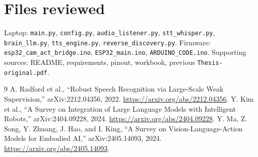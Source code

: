 \documentclass[12pt,a4paper]{report}
\begin{document}
\chapter{Files reviewed}
Laptop: \texttt{main.py}, \texttt{config.py}, \texttt{audio\_listener.py}, \texttt{stt\_whisper.py}, \texttt{brain\_llm.py}, \texttt{tts\_engine.py}, \texttt{reverse\_discovery.py}. Firmware: \texttt{esp32\_cam\_act\_bridge.ino}, \texttt{ESP32\_main.ino}, \texttt{ARDUINO\_CODE.ino}. Supporting sources: README, requirements, pinout, workbook, previous \texttt{Thesis-original.pdf}.
\begin{thebibliography}{9}
 A. Radford et al., ``Robust Speech Recognition via Large-Scale Weak Supervision,'' arXiv:2212.04356, 2022. \url{https://arxiv.org/abs/2212.04356}.
 Y. Kim et al., ``A Survey on Integration of Large Language Models with Intelligent Robots,'' arXiv:2404.09228, 2024. \url{https://arxiv.org/abs/2404.09228}.
 Y. Ma, Z. Song, Y. Zhuang, J. Hao, and I. King, ``A Survey on Vision-Language-Action Models for Embodied AI,'' arXiv:2405.14093, 2024. \url{https://arxiv.org/abs/2405.14093}.
\end{thebibliography}
\end{document}
